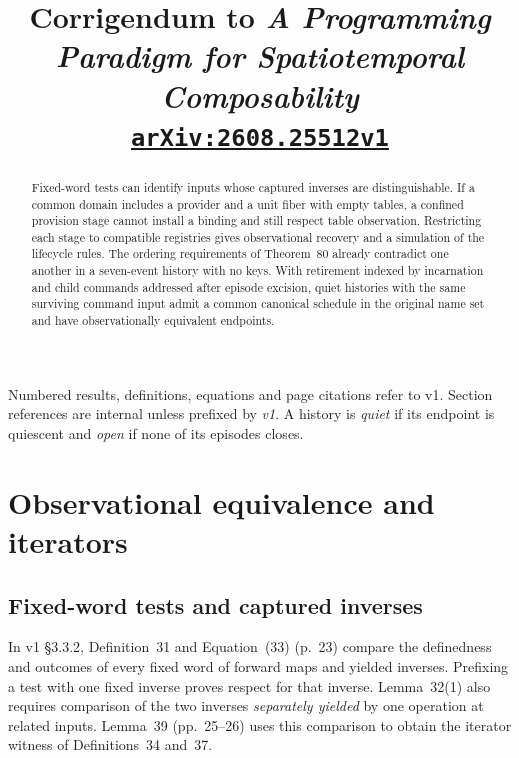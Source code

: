 \documentclass[11pt,a4paper]{article}
\title{Corrigendum to \emph{A Programming Paradigm for Spatiotemporal Composability}\\
  {\large\href{https://arxiv.org/abs/2608.25512v1}{\texttt{arXiv:2608.25512v1}}}}
\author{}
\date{}
\theoremstyle{definition}
\theoremstyle{plain}
\begin{document}
\maketitle

\begin{abstract}
Fixed-word tests can identify inputs whose captured inverses are distinguishable.
If a common domain includes a provider and a unit fiber with empty tables, a confined provision stage cannot install a binding and still respect table observation.
Restricting each stage to compatible registries gives observational recovery and a simulation of the lifecycle rules.
The ordering requirements of Theorem~80 already contradict one another in a seven-event history with no keys.
With retirement indexed by incarnation and child commands addressed after episode excision, quiet histories with the same surviving command input admit a common canonical schedule in the original name set and have observationally equivalent endpoints.
\end{abstract}

\noindent
Numbered results, definitions, equations and page citations refer to v1. Section references are internal unless prefixed by \emph{v1}.
A history is \emph{quiet} if its endpoint is quiescent and \emph{open} if none of its episodes closes.

\section{Observational equivalence and iterators}
\label{sec:obs}

\subsection{Fixed-word tests and captured inverses}
\label{sec:obs-tests}

In v1 \S3.3.2, Definition~31 and Equation~(33) (p.~23) compare the definedness and outcomes of every fixed word of forward maps and yielded inverses.
Prefixing a test with one fixed inverse proves respect for that inverse.
Lemma~32(1) also requires comparison of the two inverses \emph{separately yielded} by one operation at related inputs.
Lemma~39 (pp.~25--26) uses this comparison to obtain the iterator witness of Definitions~34 and~37.
\end{document}
